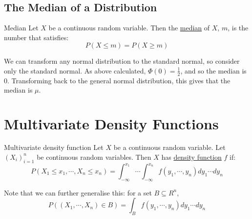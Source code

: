 \documentclass[../Main.tex]{subfiles}
\begin{document}
\subsection{The Median of a Distribution}
\begin{definition}{Median}
    Let $X$ be a continuous random variable. Then the \underline{median} of $X$, $m$, is the number that satisfies:
    \begin{equation*}
        P(X \leq m) = P(X \geq m)
    \end{equation*}
\end{definition}
\begin{example}[Median of $X$]
    We can transform any normal distribution to the standard normal, so consider only the standard normal. As above calculated, $\Phi(0) = \frac{1}{2}$, and so the median is 0. Transforming back to the general normal distribution, this gives that the median is $\mu$.
\end{example}
\section{Multivariate Density Functions}
\begin{definition}{Multivariate density function}
    Let $X$ be a continuous random variable. Let $(X_i)_{i=1}^n$ be continuous random variables. Then $X$ has \underline{density function} $f$ if:
    \begin{equation*}
        P(X_1 \leq x_1, \cdots, X_n \leq x_n) = \int_{-\infty}^{x_1} \cdots \int_{-\infty}^{x_n} f(y_1, \cdots, y_n) dy_1 \cdots dy_n
    \end{equation*}
\end{definition}
Note that we can further generalise this: for a set $B \subseteq R^n$,
\begin{equation*}
    P((X_1, \cdots, X_n) \in B) = \int_B f(y_1, \cdots, y_n) dy_1 \cdots dy_n
\end{equation*}
\end{document}
